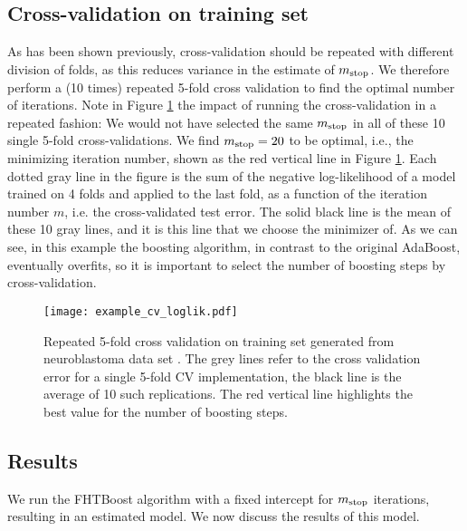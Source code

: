 \subsection{Cross-validation on training set}
As has been shown previously, cross-validation should be repeated with different division of folds, as this reduces variance in the estimate of $m_{\text{stop}}$.
We therefore perform a (10 times) repeated 5-fold cross validation to find the optimal number of iterations.
Note in Figure \ref{fig:neuroblastoma-cv} the impact of running the cross-validation in a repeated fashion:
We would not have selected the same $m_{\text{stop}}$ in all of these 10 single 5-fold cross-validations.
We find $m_{\text{stop}}=20$ to be optimal, i.e., the minimizing iteration number, shown as the red vertical line in Figure \ref{fig:neuroblastoma-cv}.
Each dotted gray line in the figure is the sum of the negative log-likelihood of a model trained on 4 folds and applied to the last fold, as a function of the iteration number $m$, i.e. the cross-validated test error.
The solid black line is the mean of these 10 gray lines, and it is this line that we choose the minimizer of.
As we can see, in this example the boosting algorithm, in contrast to the original AdaBoost, eventually overfits, so it is important to select the number of boosting steps by cross-validation.

\begin{figure}
\caption{
    Repeated 5-fold cross validation on training set generated from neuroblastoma data set \citep{oberthuer-data}.
    The grey lines refer to the cross validation error for a single 5-fold CV implementation,
    the black line is the average of 10 such replications.
    The red vertical line highlights the best value for the number of boosting steps.
}
\label{fig:neuroblastoma-cv}
\centering\texttt{[image: example\_cv\_loglik.pdf]}
\end{figure}

\subsection{Results}
We run the FHTBoost algorithm with a fixed intercept for $m_{\text{stop}}$ iterations, resulting in an estimated model.
We now discuss the results of this model.

